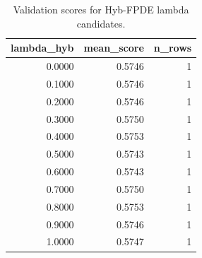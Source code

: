 \begin{table}[t]
\caption{Validation scores for Hyb-FPDE lambda candidates.}
\label{tab:lambda_distribution_computed}
\centering
\begin{tabular}{rrr}
\toprule
lambda\_hyb & mean\_score & n\_rows \\
\midrule
0.0000 & 0.5746 & 1 \\
0.1000 & 0.5746 & 1 \\
0.2000 & 0.5746 & 1 \\
0.3000 & 0.5750 & 1 \\
0.4000 & 0.5753 & 1 \\
0.5000 & 0.5743 & 1 \\
0.6000 & 0.5743 & 1 \\
0.7000 & 0.5750 & 1 \\
0.8000 & 0.5753 & 1 \\
0.9000 & 0.5746 & 1 \\
1.0000 & 0.5747 & 1 \\
\bottomrule
\end{tabular}

\end{table}
